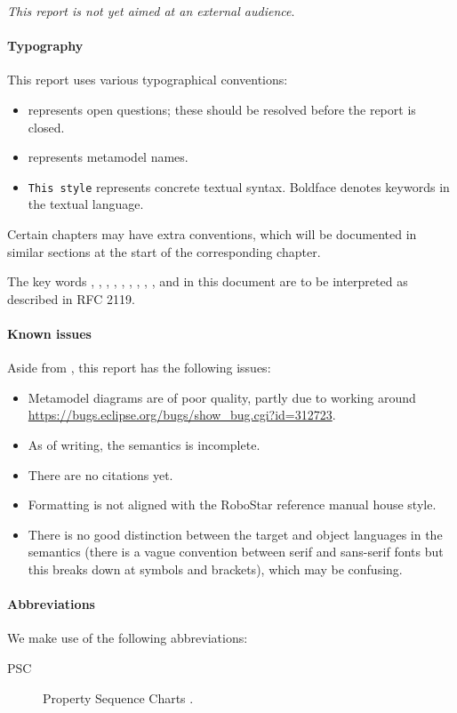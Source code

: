 
\emph{This report is not yet aimed at an external audience}.

\paragraph{Typography}
This report uses various typographical conventions:

\begin{itemize}
\item
	 represents open questions; these should be
	resolved before the report is closed.
\item
	 represents metamodel names.
\item
	\texttt{This style} represents concrete textual syntax.  Boldface
	denotes keywords in the textual language.
\end{itemize}

Certain chapters may have extra conventions, which will be documented in
similar sections at the start of the corresponding chapter.

The key words \rfcmust, \rfcmustnot, \rfcrequired, \rfcshall, \rfcshallnot,
\rfcshould, \rfcshouldnot, \rfcrecommended, \rfcmay, and \rfcoptional{} in this
document are to be interpreted as described in RFC 2119.

\paragraph{Known issues}
Aside from , this report has the following issues:

\begin{itemize}
\item
	Metamodel diagrams are of poor quality, partly due to working around
	\url{https://bugs.eclipse.org/bugs/show_bug.cgi?id=312723}.
\item
	As of writing, the semantics is incomplete.
\item
	There are no citations yet.	
\item
	Formatting is not aligned with the RoboStar reference manual house
	style.
\item
	There is no good distinction between the target and object languages
	in the semantics (there is a vague convention between serif and
	sans-serif fonts but this breaks down at symbols and brackets),
	which may be confusing.
\end{itemize}

\paragraph{Abbreviations} We make use of the following abbreviations:

\begin{description}
	\item[PSC] Property Sequence Charts .
\end{description}
